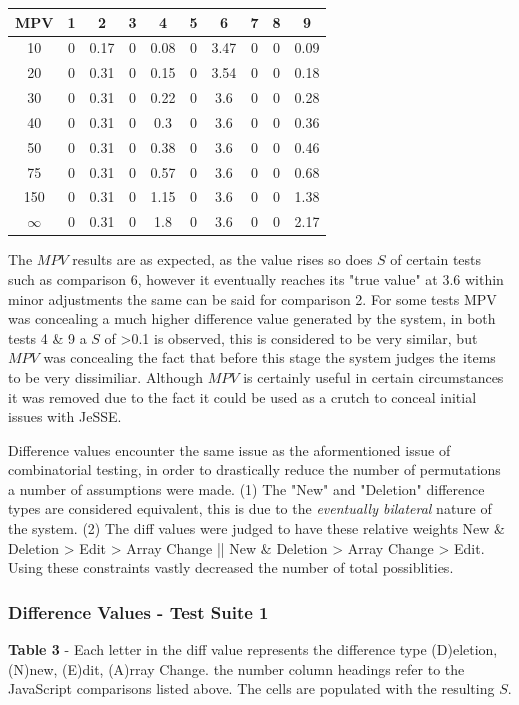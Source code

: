 \documentclass[jou,apacite]{apa6}
\begin{document}
\begin{center}
 \begin{tabular}{||c c c c c c c c c c||} 
 \hline
 MPV  & 1 & 2 & 3 & 4 & 5 & 6 & 7 & 8 & 9 \\ [0.5ex] 
 \hline\hline
 10 & 0 & 0.17 & 0 & 0.08 & 0 & 3.47 & 0 & 0 & 0.09 \\ 
 \hline
 20 & 0 & 0.31 & 0 & 0.15 & 0 & 3.54 & 0 & 0 & 0.18 \\ 
 \hline
 30 & 0 & 0.31 & 0 & 0.22 & 0 & 3.6 & 0 & 0 & 0.28 \\ 
 \hline
  40 & 0 & 0.31 & 0 & 0.3 & 0 & 3.6 & 0 & 0 & 0.36 \\ 
  \hline
    50 & 0 & 0.31 & 0 & 0.38 & 0 & 3.6 & 0 & 0 & 0.46 \\ 
  \hline
   75 & 0 & 0.31 & 0 & 0.57 & 0 & 3.6 & 0 & 0 & 0.68 \\ 
  \hline
  150 & 0 & 0.31 & 0 & 1.15 & 0 & 3.6 & 0 & 0 & 1.38 \\ 
  \hline
  $\infty$ & 0 & 0.31 & 0 & 1.8 & 0 & 3.6 & 0 & 0 & 2.17 \\ 
  \hline
  
\end{tabular}
\end{center}

The $MPV$ results are as expected, as the value rises so does $S$ of certain tests such as comparison 6, however it eventually reaches its "true value" at 3.6 within minor adjustments the same can be said for comparison 2. For some tests MPV was concealing a much higher difference value generated by the system, in both tests 4 \& 9 a $S$ of >0.1  is observed, this is considered to be very similar, but $MPV$ was concealing the fact that before this stage the system judges the items to be  very dissimiliar. Although $MPV$ is certainly useful in certain circumstances it was removed due to the fact it could be used as a crutch to conceal initial issues with JeSSE. 

Difference values encounter the same issue as the aformentioned issue of combinatorial testing, in order to drastically reduce the number of permutations a number of assumptions were made. (1) The "New" and "Deletion" difference types are considered equivalent, this is due to the \textit{eventually bilateral} nature of the system. (2) The diff values were judged to have these relative weights New \& Deletion > Edit > Array Change || New \& Deletion > Array Change > Edit. Using these constraints vastly decreased the number of total possiblities.

\subsubsection{Difference Values - Test Suite 1}
\textbf{Table 3} - Each letter in the diff value represents the difference type (D)eletion, (N)new, (E)dit, (A)rray Change. the number column headings refer to the JavaScript comparisons listed above. The cells are populated with the resulting $S$.
\end{document}
